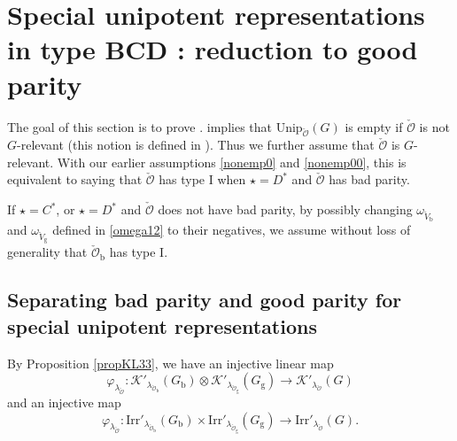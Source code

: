 \documentclass[12pt]{amsart}
\newcommand{\CK}{{\mathcal {K}}}
\newcommand{\CO}{{\mathcal {O}}}
\newcommand{\be}{\begin {equation}}
\newcommand{\ee}{\end {equation}}
\numberwithin{equation}{section}
\theoremstyle{remark}
\def\Irr{\mathrm{Irr}}
\def\Unip{\mathrm{Unip}}
\begin{document}
\section{Special unipotent representations in type BCD :  reduction to good parity}\label{sec:red}

The goal of this section is to prove .
 implies that $\Unip_{\check \CO}(G)$ is empty if  $\check \CO$ is not $G$-relevant (this notion is defined in ). Thus we further assume that $\check \CO$ is $G$-relevant. With our earlier assumptions \eqref{nonemp0} and \eqref{nonemp00}, this is equivalent to saying that $\check \CO$ has type I when $\star=D^*$ and $\check \CO$ has bad parity.


If $\star=C^*$, or $\star=D^*$ and $\check \CO $ does not have bad parity, by possibly changing $\omega_{\check V_\mathrm b}$ and $\omega_{\check V_\mathrm g}$ defined in \eqref{omega12} to their negatives, we
assume without loss of generality that  ${\check \CO_\mathrm b}$ has type I.

\subsection{Separating bad parity and good parity for special unipotent representations}

By Proposition \ref{propKL33},  we have an injective linear map
\[
 \varphi_{\lambda_{\check \CO}} : \CK'_{\lambda_{\check \CO_\mathrm b}}(G_{\mathrm b})\otimes  \CK'_{\lambda_{\check \CO_\mathrm g}}(G_{\mathrm g})\rightarrow\CK'_{\lambda_{\check \CO}}(G)
\]
and an injective map
\be\label{injirr}
   \varphi_{\lambda_{\check \CO}} : \Irr'_{\lambda_{\check \CO_\mathrm b}}(G_\mathrm b)\times  \Irr'_{\lambda_{\check \CO_\mathrm g}}(G_\mathrm g)\rightarrow  \Irr'_{\lambda_{\check \CO}}(G).
\ee
\end{document}
